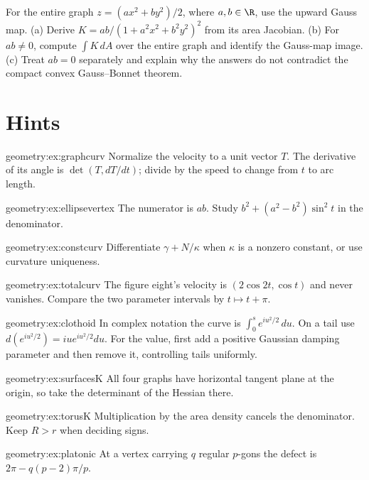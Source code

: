 \begin{exercise}[$\star\star\star$]\label{ex:v9-app-k-noncompact-gauss}
For the entire graph $z=(ax^2+by^2)/2$, where $a,b\in\R$, use the upward Gauss map.
(a) Derive $K=ab/(1+a^2x^2+b^2y^2)^2$ from its area Jacobian.
(b) For $ab\ne0$, compute $\int K\,dA$ over the entire graph and identify the Gauss-map image.
(c) Treat $ab=0$ separately and explain why the answers do not contradict the compact convex Gauss--Bonnet theorem.
\end{exercise}

\section{Hints}

\begin{hint}{geometry:ex:graphcurv}
Normalize the velocity to a unit vector $T$. The derivative of its angle is $\det(T,dT/dt)$; divide by the speed to change from $t$ to arc length.
\end{hint}
\begin{hint}{geometry:ex:ellipsevertex}
The numerator is $ab$. Study $b^2+(a^2-b^2)\sin^2t$ in the denominator.
\end{hint}
\begin{hint}{geometry:ex:constcurv}
Differentiate $\gamma+N/\kappa$ when $\kappa$ is a nonzero constant, or use curvature uniqueness.
\end{hint}
\begin{hint}{geometry:ex:totalcurv}
The figure eight's velocity is $(2\cos2t,\cos t)$ and never vanishes. Compare the two parameter intervals by $t\mapsto t+\pi$.
\end{hint}
\begin{hint}{geometry:ex:clothoid}
In complex notation the curve is $\int_0^s e^{iu^2/2}\,du$. On a tail use $d(e^{iu^2/2})=iu e^{iu^2/2}du$. For the value, first add a positive Gaussian damping parameter and then remove it, controlling tails uniformly.
\end{hint}
\begin{hint}{geometry:ex:surfacesK}
All four graphs have horizontal tangent plane at the origin, so take the determinant of the Hessian there.
\end{hint}
\begin{hint}{geometry:ex:torusK}
Multiplication by the area density cancels the denominator. Keep $R>r$ when deciding signs.
\end{hint}
\begin{hint}{geometry:ex:platonic}
At a vertex carrying $q$ regular $p$-gons the defect is $2\pi-q(p-2)\pi/p$.
\end{hint}
